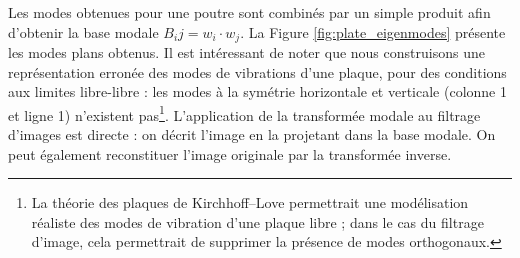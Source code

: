 Les modes obtenues pour une poutre sont combinés par un simple produit afin d'obtenir la base modale $B_ij = w_i \cdot w_j$.
La Figure \ref{fig:plate_eigenmodes} présente les modes plans obtenus.
Il est intéressant de noter que nous construisons une représentation erronée des modes de vibrations d'une plaque, pour des conditions aux limites libre-libre : les modes à la symétrie horizontale et verticale (colonne 1 et ligne 1) n'existent pas\footnote{La théorie des plaques de Kirchhoff–Love permettrait une modélisation réaliste des modes de vibration d'une plaque libre ; dans le cas du filtrage d'image, cela permettrait de supprimer la présence de modes orthogonaux.}.
L'application de la transformée modale au filtrage d'images est directe : on décrit l'image en la projetant dans la base modale.
On peut également reconstituer l'image originale par la transformée inverse.


